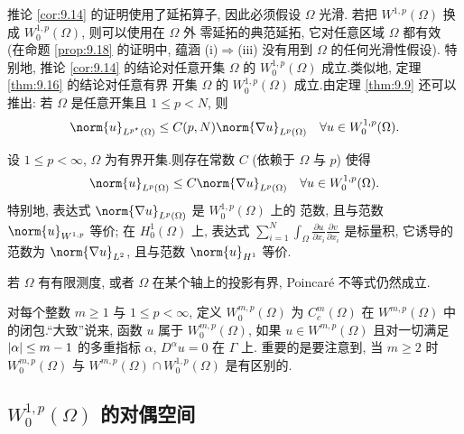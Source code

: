 \begin{remark}
\label{rem:9.20}
推论  \ref{cor:9.14} 的证明使用了延拓算子, 因此必须假设 $\Omega$ 光滑.
若把 $W^{1,p}(\Omega)$ 换成 $W_0^{1,p}(\Omega)$, 则可以使用在 $\Omega$ 外
零延拓的典范延拓, 它对任意区域 $\Omega$ 都有效 (在命题  \ref{prop:9.18}
的证明中, 蕴涵 (i)$\Rightarrow$(iii) 没有用到 $\Omega$ 的任何光滑性假设).
特别地, 推论  \ref{cor:9.14} 的结论对任意开集 $\Omega$ 的
$W_0^{1,p}(\Omega)$ 成立.类似地, 定理  \ref{thm:9.16} 的结论对任意有界
开集 $\Omega$ 的 $W_0^{1,p}(\Omega)$ 成立.由定理  \ref{thm:9.9} 还可以推出:
若 $\Omega$ 是任意开集且 $1\le p<N$, 则
\begin{equation}
\norm{u}_{L^{p^\star}(\Omega)}\le C(p,N)\norm{\nabla u}_{L^p(\Omega)}
\quad\forall u\in W_0^{1,p}(\Omega).
\label{eq:9.30}
\end{equation}
\end{remark}

\begin{keycorollary}
\label{cor:9.19}
设 $1\le p<\infty$, $\Omega$ 为有界开集.则存在常数 $C$ (依赖于 $\Omega$
与 $p$) 使得
\begin{equation*}
\norm{u}_{L^p(\Omega)}\le C\norm{\nabla u}_{L^p(\Omega)}
\quad\forall u\in W_0^{1,p}(\Omega).
\end{equation*}
特别地, 表达式 $\norm{\nabla u}_{L^p(\Omega)}$ 是 $W_0^{1,p}(\Omega)$ 上的
范数, 且与范数 $\norm{u}_{W^{1,p}}$ 等价; 在 $H_0^1(\Omega)$ 上, 表达式
$\sum_{i=1}^N\int_\Omega\frac{\partial u}{\partial x_i}
\frac{\partial v}{\partial x_i}$ 是标量积, 它诱导的范数为
$\norm{\nabla u}_{L^2}$, 且与范数 $\norm{u}_{H^1}$ 等价.
\end{keycorollary}

\begin{remark}
\label{rem:9.21}
若 $\Omega$ 有有限测度, 或者 $\Omega$ 在某个轴上的投影有界, Poincaré
不等式仍然成立.
\end{remark}

\begin{remark}
\label{rem:9.22}
对每个整数 $m\ge1$ 与 $1\le p<\infty$, 定义 $W_0^{m,p}(\Omega)$ 为
$C_c^m(\Omega)$ 在 $W^{m,p}(\Omega)$ 中的闭包.``大致''说来, 函数
$u$ 属于 $W_0^{m,p}(\Omega)$, 如果 $u\in W^{m,p}(\Omega)$ 且对一切满足
$\left|\alpha\right|\le m-1$ 的多重指标 $\alpha$, $D^\alpha u=0$ 在 $\Gamma$ 上.
重要的是要注意到, 当 $m\ge2$ 时 $W_0^{m,p}(\Omega)$ 与
$W^{m,p}(\Omega)\cap W_0^{1,p}(\Omega)$ 是有区别的.
\end{remark}

\subsection*{$W_0^{1,p}(\Omega)$ 的对偶空间}

